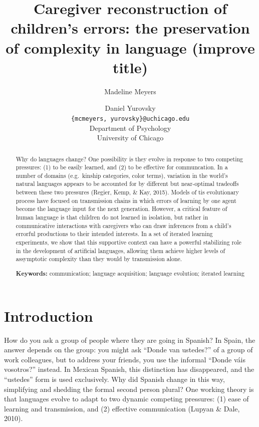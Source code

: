 \documentclass[10pt, letterpaper]{article}
\title{Caregiver reconstruction of children's errors: the preservation of
complexity in language (improve title)}
\author{Madeline Meyers \and Daniel Yurovsky \\
        \texttt{\{mcmeyers, yurovsky\}@uchicago.edu} \\
       Department of Psychology \\ University of Chicago}
\begin{document}
\maketitle

\begin{abstract}
Why do languages change? One possibility is they evolve in response to
two competing pressures: (1) to be easily learned, and (2) to be
effective for communcation. In a number of domains (e.g.~kinship
categories, color terms), variation in the world's natural languages
appears to be accounted for by different but near-optimal tradeoffs
between these two pressures (Regier, Kemp, \& Kay, 2015). Models of tis
evolutionary process have focused on transmission chains in which errors
of learning by one agent become the language input for the next
generation. However, a critical feature of human language is that
children do not learned in isolation, but rather in communicative
interactions with caregivers who can draw inferences from a child's
errorful productions to their intended interests. In a set of iterated
learning experiments, we show that this supportive context can have a
powerful stabilizing role in the development of artificial languages,
allowing them achieve higher levels of assymptotic complexity than they
would by transmission alone.

\textbf{Keywords:}
communication; language acquisition; language evolution; iterated
learning
\end{abstract}

\section{Introduction}\label{introduction}

How do you ask a group of people where they are going in Spanish? In
Spain, the answer depends on the group: you might ask ``Donde van
ustedes?'' of a group of work colleagues, but to address your friends,
you use the informal ``Donde váis vosotros?'' instead. In Mexican
Spanish, this distinction has disappeared, and the ``ustedes'' form is
used exclusively. Why did Spanish change in this way, simplifying and
shedding the formal second person plural? One working theory is that
languages evolve to adapt to two dynamic competing pressures: (1) ease
of learning and transmission, and (2) effective communication (Lupyan \&
Dale, 2010).
\end{document}
